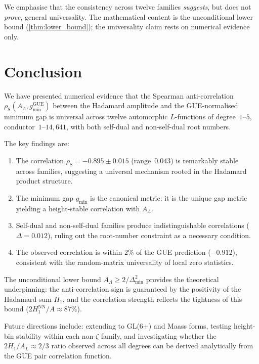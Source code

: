 \documentclass[11pt, a4paper]{article}
\theoremstyle{plain}
\theoremstyle{definition}
\newcommand{\Lam}{\Lambda}
\DeclareMathOperator{\GUE}{GUE}
\begin{document}
We emphasise that the consistency across twelve families
\emph{suggests}, but does not \emph{prove}, general universality.
The mathematical content is the unconditional lower bound
(\cref{thm:lower_bound}); the universality claim rests on
numerical evidence only.


\section{Conclusion}
\label{sec:conclusion}

We have presented numerical evidence that the Spearman
anti-correlation $\rho_{\mathrm{S}}(A_\Lam, g_{\min}^{\GUE})$
between the Hadamard amplitude and the GUE-normalised minimum
gap is universal across twelve automorphic $L$-functions of
degree~$1$--$5$, conductor~$1$--$14{,}641$, with both self-dual and
non-self-dual root numbers.

The key findings are:
\begin{enumerate}
  \item The correlation $\rho_{\mathrm{S}} = -0.895 \pm 0.015$
        (range~$0.043$) is remarkably stable across families,
        suggesting a universal mechanism rooted in the Hadamard
        product structure.
  \item The minimum gap $g_{\min}$ is the canonical metric:
        it is the unique gap metric yielding a height-stable
        correlation with $A_\Lam$.
  \item Self-dual and non-self-dual families produce
        indistinguishable correlations ($\Delta = 0.012$),
        ruling out the root-number constraint as a necessary
        condition.
  \item The observed correlation is within $2\%$ of the GUE
        prediction ($-0.912$), consistent with the
        random-matrix universality of local zero statistics.
\end{enumerate}

The unconditional lower bound
$A_\Lam \ge 2/\Delta_{\min}^2$ provides the theoretical
underpinning: the anti-correlation sign is guaranteed by the
positivity of the Hadamard sum $H_1$, and the correlation
strength reflects the tightness of this bound
($2H_1^{\mathrm{NN}}/A \approx 87\%$).

Future directions include:
extending to GL(6+) and Maass forms,
testing height-bin stability within each non-$\zeta$ family,
and investigating whether the $2H_1/A_L \approx 2/3$ ratio
observed across all degrees can be derived analytically from
the GUE pair correlation function.
\end{document}
